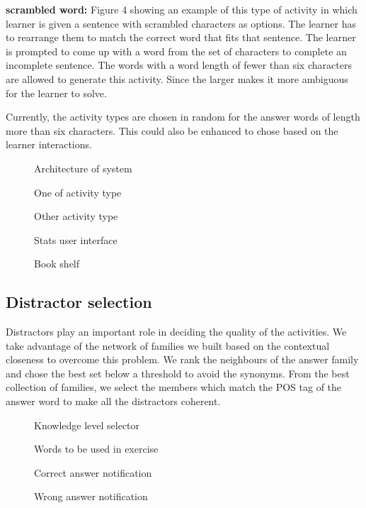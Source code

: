 \documentclass[11pt,a4paper]{article}
\begin{document}
\textbf{scrambled word:} Figure 4 showing an example of this type of activity in which learner is given a sentence with scrambled characters as options. The learner has to rearrange them to match the correct word that fits that sentence.  The learner is prompted to come up with a word from the
set of characters to complete an incomplete sentence. The words with a word length of
fewer than six characters are allowed to generate this activity. Since the larger makes it more ambiguous for the learner to solve.

Currently, the activity types are chosen in random for the answer words of length
more than six characters. This could also be enhanced to chose based on the learner interactions.

\begin{figure}
\begin{tcbraster}[raster columns=1, enhanced, blankest]
\caption{Architecture of system}

\end{tcbraster}
\end{figure}


\begin{figure}
\begin{tcbraster}[raster columns=1, enhanced, blankest]
\caption{One of activity type}

\caption{Other activity type}

\caption{Stats user interface}


\caption{Book shelf}

\end{tcbraster}
\end{figure}

\subsection{Distractor selection}
Distractors play an important role in deciding the quality of the activities.
We take advantage of the network of families we built based on the contextual
closeness to overcome this problem. We rank the neighbours of the
answer family and chose the best set below a threshold to avoid the synonyms. From
the best collection of families, we select the members which match the POS tag of the answer word to make all the distractors coherent.


\begin{figure}
\begin{tcbraster}[raster columns=1, enhanced, blankest]
\caption{Knowledge level selector}
\caption{Words to be used in exercise}
\caption{Correct answer notification}
\caption{Wrong answer notification}
\end{tcbraster}
\end{figure}
\end{document}
